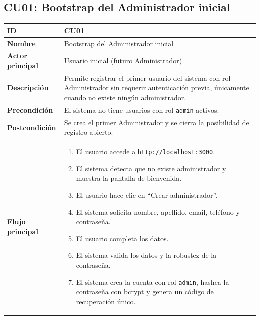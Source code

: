 \documentclass[11pt,a4paper]{article}
\begin{document}
\subsection*{CU01: Bootstrap del Administrador inicial}
\begin{longtable}{|L{3.5cm}|L{10cm}|}
    \hline
    \textbf{ID}                & CU01                                                                                                                                                       \\ \hline
    \textbf{Nombre}            & Bootstrap del Administrador inicial                                                                                                                        \\ \hline
    \textbf{Actor principal}   & Usuario inicial (futuro Administrador)                                                                                                                     \\ \hline
    \textbf{Descripción}       & Permite registrar el primer usuario del sistema con rol Administrador sin requerir autenticación previa, únicamente cuando no existe ningún administrador. \\ \hline
    \textbf{Precondición}      & El sistema no tiene usuarios con rol \texttt{admin} activos.                                                                                               \\ \hline
    \textbf{Postcondición}     & Se crea el primer Administrador y se cierra la posibilidad de registro abierto.                                                                            \\ \hline
    \textbf{Flujo principal}   &
    \begin{enumerate}
        \item El usuario accede a \texttt{http://localhost:3000}.
        \item El sistema detecta que no existe administrador y muestra la pantalla de bienvenida.
        \item El usuario hace clic en ``Crear administrador''.
        \item El sistema solicita nombre, apellido, email, teléfono y contraseña.
        \item El usuario completa los datos.
        \item El sistema valida los datos y la robustez de la contraseña.
        \item El sistema crea la cuenta con rol \texttt{admin}, hashea la contraseña con bcrypt y genera un código de recuperación único.

\end{enumerate}
\end{longtable}
\end{document}
